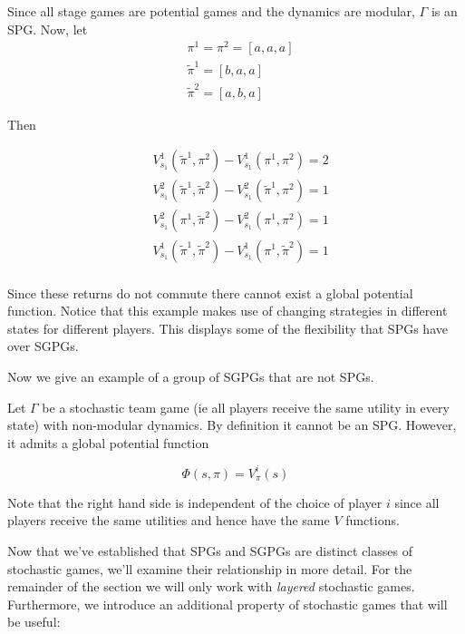 \begin{eg}

Since all stage games are potential games and the dynamics are modular, $\Gamma$ is an SPG. Now, let
\begin{align*}
&\pi^1 = \pi^2 = [a,a,a] \\
&\tilde{\pi}^1 = [b,a,a] \\
&\tilde{\pi}^2 = [a,b,a]
\end{align*}

Then

\begin{align*}
&V^1_{s_1}(\tilde{\pi}^1, \pi^2) - V^1_{s_1}(\pi^1, \pi^2) = 2 \\
&V^2_{s_1}(\tilde{\pi}^1, \tilde{\pi}^2) - V^2_{s_1}(\tilde{\pi}^1, \pi^2) = 1 \\
&V^2_{s_1}(\pi^1, \tilde{\pi}^2) - V^2_{s_1}(\pi^1, \pi^2) = 1 \\
&V^1_{s_1}(\tilde{\pi}^1, \tilde{\pi}^2) - V^1_{s_1}(\pi^1, \tilde{\pi}^2) = 1 \\
\end{align*}

Since these returns do not commute there cannot exist a global potential function. Notice that this example makes use of changing strategies in different states for different players. This displays some of the flexibility that SPGs have over SGPGs.

\end{eg}


Now we give an example of a group of SGPGs that are not SPGs.

\begin{eg}
Let $\Gamma$ be a stochastic team game (ie all players receive the same utility in every state) with non-modular dynamics. By definition it cannot be an SPG. However, it admits a global potential function

$$
\Phi(s, \pi) = V^i_{\pi}(s)
$$

Note that the right hand side is independent of the choice of player $i$ since all players receive the same utilities and hence have the same $V$ functions.
\end{eg}


Now that we've established that SPGs and SGPGs are distinct classes of stochastic games, we'll examine their relationship in more detail. For the remainder of the section we will only work with {\em layered} stochastic games. Furthermore, we introduce an additional property of stochastic games that will be useful:

